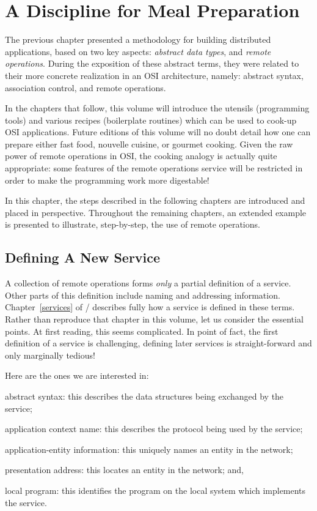 
\chapter	{A Discipline for Meal Preparation}\label{cook:discipline}
The previous chapter
presented a methodology for building distributed applications,
based on two key aspects:
{\em abstract data types}, and {\em remote operations}.
During the exposition of these abstract terms,
they were related to their more concrete realization in an OSI architecture,
namely: abstract syntax, association control, and remote operations.

In the chapters that follow,
this volume will introduce the utensils (programming tools)
and various recipes (boilerplate routines)
which can be used to cook-up OSI applications.
Future editions of this volume will no doubt detail how one can prepare
either fast food, nouvelle cuisine, or gourmet cooking.
Given the raw power of remote operations in OSI,
the cooking analogy is actually quite appropriate:
some features of the remote operations service will be restricted in order to
make the programming work more digestable!

In this chapter,
the steps described in the following chapters are introduced and placed in
perspective.
Throughout the remaining chapters,
an extended example is presented to illustrate, step-by-step,
the use of remote operations.

\section	{Defining A New Service}\label{service:define}
A collection of remote operations forms {\em only\/} a partial definition of a
service.
Other parts of this definition include naming and addressing information.
Chapter~\ref{services} of \volone/ describes fully how a service is defined
in these terms.
Rather than reproduce that chapter in this volume,
let us consider the essential points.
At first reading,
this seems complicated.
In point of fact,
the first definition of a service is challenging,
defining later services is straight-forward and only marginally tedious!

Here are the ones we are interested in:
\begin{describe}
\item[abstract syntax:]	this describes the data structures being exchanged by
the service;

\item[application context name:] this describes the protocol being used by
the service;

\item[application-entity information:] this uniquely names an entity in the
network;

\item[presentation address:] this locates an entity in the network;
and,

\item[local program:] this identifies the program on the local system which
implements the service.
\end{describe}

